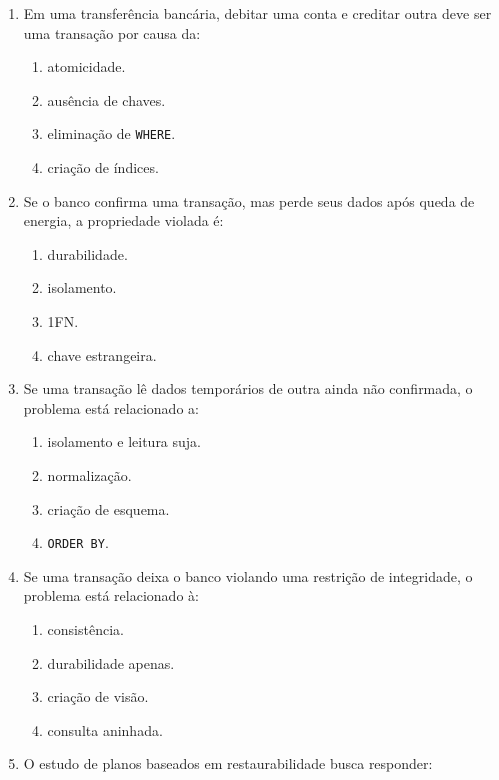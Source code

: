 \documentclass[12pt,a4paper]{article}
\begin{document}
\begin{enumerate}[label=\textbf{Q\arabic*.}]
\item Em uma transferência bancária, debitar uma conta e creditar outra deve ser uma transação por causa da:

\begin{enumerate}[label=\alph*)]
    \item atomicidade.
    \item ausência de chaves.
    \item eliminação de \texttt{WHERE}.
    \item criação de índices.
\end{enumerate}

\item Se o banco confirma uma transação, mas perde seus dados após queda de energia, a propriedade violada é:

\begin{enumerate}[label=\alph*)]
    \item durabilidade.
    \item isolamento.
    \item 1FN.
    \item chave estrangeira.
\end{enumerate}

\item Se uma transação lê dados temporários de outra ainda não confirmada, o problema está relacionado a:

\begin{enumerate}[label=\alph*)]
    \item isolamento e leitura suja.
    \item normalização.
    \item criação de esquema.
    \item \texttt{ORDER BY}.
\end{enumerate}

\item Se uma transação deixa o banco violando uma restrição de integridade, o problema está relacionado à:

\begin{enumerate}[label=\alph*)]
    \item consistência.
    \item durabilidade apenas.
    \item criação de visão.
    \item consulta aninhada.
\end{enumerate}

\item O estudo de planos baseados em restaurabilidade busca responder:


\end{enumerate}
\end{document}
